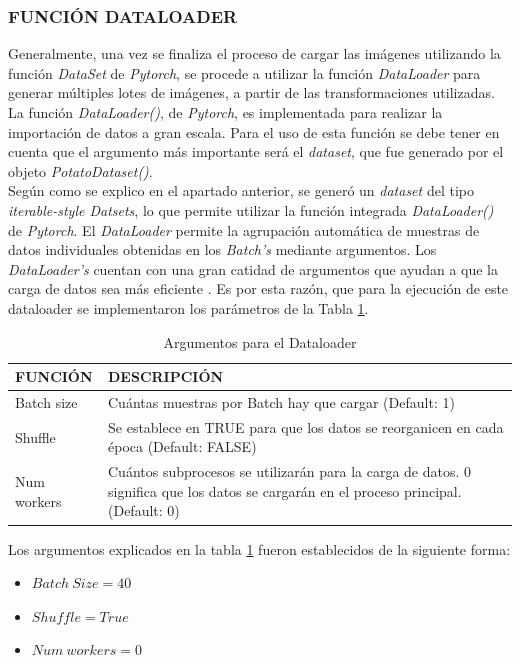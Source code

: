 \subsubsection{FUNCIÓN DATALOADER}			

Generalmente, una vez se finaliza el proceso de cargar las imágenes utilizando la función \textit{DataSet} de \textit{Pytorch}, se procede a utilizar la función \textit{DataLoader} para generar múltiples lotes de imágenes, a partir de las transformaciones utilizadas. La función \textit{DataLoader()}, de \textit{Pytorch}, es implementada para realizar la importación de datos a gran escala. Para el uso de esta función se debe tener en cuenta que el argumento más importante será el \textit{dataset}, que fue generado por el objeto \textit{PotatoDataset()}. \\

Según como se explico en el apartado anterior, se generó un \textit{dataset} del tipo \textit{iterable-style Datsets}, lo que permite utilizar la función integrada \textit{DataLoader()} de \textit{Pytorch}. El \textit{DataLoader} permite la agrupación automática de muestras de datos individuales obtenidas en los \textit{Batch's} mediante argumentos. Los \textit{DataLoader's} cuentan con una gran catidad de argumentos que ayudan a que la carga de datos sea más eficiente \cite{Pytorch}. Es por esta razón, que para la ejecución de este dataloader se implementaron los parámetros de la Tabla \ref{table:Argumentos}.
\newpage			
\begin{table}[ht]
	\centering
	\begin{tabular}{|p{3cm}|p{8cm}|}
		\hline
		FUNCIÓN & DESCRIPCIÓN \\ 
		\hline
		Batch size & Cuántas muestras por Batch hay que cargar (Default: 1)\\
		\hline
		Shuffle & Se establece en TRUE para que los datos se reorganicen en cada época (Default: FALSE)  \\
		\hline
		Num workers & Cuántos subprocesos se utilizarán para la carga de datos. 0 significa que los datos se cargarán en el proceso principal. (Default: 0)\\
		\hline
	\end{tabular}	
	\caption{Argumentos para el Dataloader}
	\label{table:Argumentos}
\end{table}

Los argumentos explicados en la tabla \ref{table:Argumentos} fueron establecidos de la siguiente forma:

\begin{itemize}
	\item $Batch \ Size = 40$
	\item $Shuffle = True$
	\item $Num \ workers = 0$
\end{itemize}

